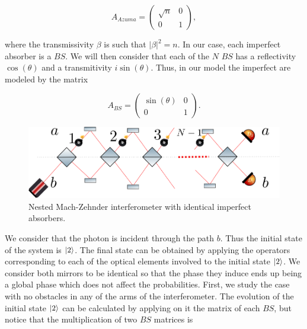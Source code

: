 \documentclass[12pt]{book}
\begin{document}
 \begin{equation}
 A_{Azuma}=\begin{pmatrix} \sqrt{n} & 0\\0& 1\end{pmatrix},
\label{absorber}
 \end{equation}
 
 where the transmissivity $\beta$  is such that $|\beta|^{2}=n$. In our case, each imperfect absorber is a $BS$. We will then consider that each of the $N$ $BS$ has a reflectivity $\cos(\theta)$ and a transmitivity $i\sin(\theta)$. Thus, in our model the imperfect are modeled by the matrix
 

\begin{equation}
 A_{BS}=\begin{pmatrix} \sin(\theta) & 0\\0& 1\end{pmatrix}.
\label{absorber1}
\end{equation}

\begin{figure}[t!]
\centering
\includegraphics[width=\linewidth]{images/nmach2.png}
\caption{Nested Mach-Zehnder interferometer  with identical imperfect absorbers.}
\label{Nmach}
\end{figure}


We consider that the photon is incident through the path $b$. Thus the initial state of the system is $\ket{2}$. The final state can be obtained by applying the operators corresponding to each of the optical elements involved to the initial state $\ket{2}$. We consider both mirrors to be identical so that the phase they induce ends up being a global phase which does not affect the probabilities. First, we study the case with no obstacles in any of the arms of the interferometer. The evolution of the initial state $\ket{2}$ can be calculated by applying on it the matrix of each $BS$, but notice that the multiplication of two $BS$ matrices is
\end{document}
